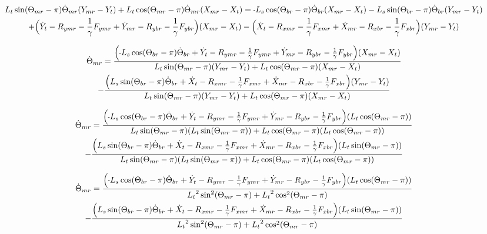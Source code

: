 \documentclass[11pt, landscape]{article}
\newcommand{\mn}{\scalebox{0.7}[1.0]{-}}
\begin{document}
\begin{multline}
L_{t}\sin(\Theta_{mr}-\pi) \dot{\Theta}_{mr} (Y_{mr} - Y_{t }) + L_{t}\cos(\Theta_{mr}-\pi) \dot{\Theta}_{mr} (X_{mr} - X_{t }) =
\mn L_{s}\cos(\Theta_{br}-\pi) \dot{\Theta}_{br} (X_{mr} - X_{t }) - L_{s}\sin(\Theta_{br}-\pi) \dot{\Theta}_{br} (Y_{mr} - Y_{t }) \\
+ \Big ( \dot{Y}_{t } - R_{ymr} - \frac{1}{\gamma}F_{ymr} + \dot{Y}_{mr} - R_{ybr} - \frac{1}{\gamma}F_{ybr} \Big ) (X_{mr} - X_{t }) 
- \Big ( \dot{X}_{t } - R_{xmr} - \frac{1}{\gamma}F_{xmr} + \dot{X}_{mr} - R_{xbr} - \frac{1}{\gamma}F_{xbr} \Big ) (Y_{mr} - Y_{t })
\end{multline}

\begin{multline}
\dot{\Theta}_{mr} =
\frac{\Big( \mn L_{s}\cos(\Theta_{br}-\pi) \dot{\Theta}_{br} + \dot{Y}_{t } - R_{ymr} - \frac{1}{\gamma}F_{ymr} + \dot{Y}_{mr} -R_{ybr} - \frac{1}{\gamma}F_{ybr}\Big) (X_{mr} - X_{t })}
{L_{t}\sin(\Theta_{mr}-\pi)(Y_{mr} - Y_{t}) + L_{t}\cos(\Theta_{mr}-\pi)(X_{mr} - X_{t })} \\
  - \frac{\Big(L_{s}\sin(\Theta_{br}-\pi) \dot{\Theta}_{br} + \dot{X}_{t } - R_{xmr} - \frac{1}{\gamma}F_{xmr} + \dot{X}_{mr} - R_{xbr} -\frac{1}{\gamma}F_{xbr} \Big)(Y_{mr} - Y_{t })}
  {L_{t}\sin(\Theta_{mr}-\pi)(Y_{mr} - Y_{t }) + L_{t}\cos(\Theta_{mr}-\pi)(X_{mr} - X_{t })}
\end{multline}

\begin{multline}
\dot{\Theta}_{mr} =
\frac{\Big( \mn L_{s}\cos(\Theta_{br}-\pi) \dot{\Theta}_{br} + \dot{Y}_{t } - R_{ymr} - \frac{1}{\gamma}F_{ymr} + \dot{Y}_{mr} -R_{ybr} - \frac{1}{\gamma}F_{ybr}\Big) (L_{t}\cos(\Theta_{mr}-\pi))}
{L_{t}\sin(\Theta_{mr}-\pi)(L_{t}\sin(\Theta_{mr}-\pi)) + L_{t}\cos(\Theta_{mr}-\pi)(L_{t}\cos(\Theta_{mr}-\pi))} \\
  - \frac{\Big(L_{s}\sin(\Theta_{br}-\pi) \dot{\Theta}_{br} + \dot{X}_{t } - R_{xmr} - \frac{1}{\gamma}F_{xmr} + \dot{X}_{mr} - R_{xbr} -\frac{1}{\gamma}F_{xbr} \Big)(L_{t}\sin(\Theta_{mr}-\pi))}
  {L_{t}\sin(\Theta_{mr}-\pi)(L_{t}\sin(\Theta_{mr}-\pi)) + L_{t}\cos(\Theta_{mr}-\pi)(L_{t}\cos(\Theta_{mr}-\pi))}
\end{multline}

\begin{multline}
\dot{\Theta}_{mr} =
\frac{\Big( \mn L_{s}\cos(\Theta_{br}-\pi) \dot{\Theta}_{br} + \dot{Y}_{t } - R_{ymr} - \frac{1}{\gamma}F_{ymr} + \dot{Y}_{mr} -R_{ybr} - \frac{1}{\gamma}F_{ybr}\Big) (L_{t}\cos(\Theta_{mr}-\pi))}
{{L_{t}}^2\sin^2(\Theta_{mr}-\pi) + {L_{t}}^2\cos^2(\Theta_{mr}-\pi)} \\
  - \frac{\Big(L_{s}\sin(\Theta_{br}-\pi) \dot{\Theta}_{br} + \dot{X}_{t } - R_{xmr} - \frac{1}{\gamma}F_{xmr} + \dot{X}_{mr} - R_{xbr} -\frac{1}{\gamma}F_{xbr} \Big)(L_{t}\sin(\Theta_{mr}-\pi))}
  {{L_{t}}^2\sin^2(\Theta_{mr}-\pi) + {L_{t}}^2\cos^2(\Theta_{mr}-\pi)}
\end{multline}
\end{document}
